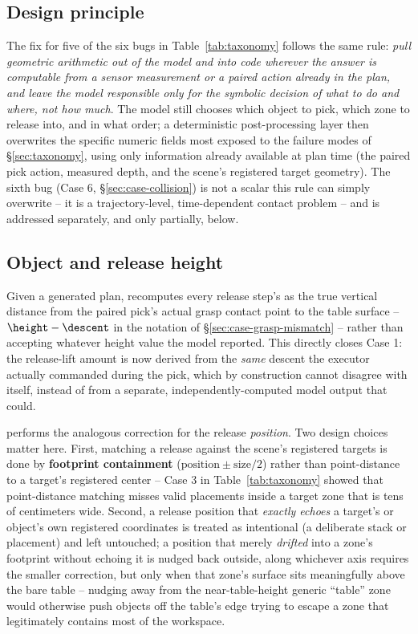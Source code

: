 \subsection{Design principle}

The fix for five of the six bugs in Table~\ref{tab:taxonomy} follows the
same rule: \emph{pull geometric arithmetic out of the model and into code
wherever the answer is computable from a sensor measurement or a paired
action already in the plan, and leave the model responsible only for the
symbolic decision of what to do and where, not how much}. The model still
chooses which object to pick, which zone to release into, and in what
order; a deterministic post-processing layer then overwrites the specific
numeric fields most exposed to the failure modes of
\S\ref{sec:taxonomy}, using only information already available at plan
time (the paired pick action, measured depth, and the scene's registered
target geometry). The sixth bug (Case 6, \S\ref{sec:case-collision}) is
not a scalar this rule can simply overwrite -- it is a trajectory-level,
time-dependent contact problem -- and is addressed separately, and only
partially, below.

\subsection{Object and release height}
\label{sec:fix-height}

Given a generated plan,  recomputes every
release step's  as the true vertical distance from
the paired pick's actual grasp contact point to the table surface --
$\height - \descent$ in the notation of \S\ref{sec:case-grasp-mismatch}
-- rather than accepting whatever height value the model reported. This
directly closes Case 1: the release-lift amount is now derived from the
\emph{same} descent the executor actually commanded during the pick,
which by construction cannot disagree with itself, instead of from a
separate, independently-computed model output that could.

 performs the analogous correction for the
release \emph{position}. Two design choices matter here. First, matching
a release against the scene's registered targets is done by
\textbf{footprint containment} ($\text{position} \pm \text{size}/2$)
rather than point-distance to a target's registered center -- Case 3 in
Table~\ref{tab:taxonomy} showed that point-distance matching misses valid
placements inside a target zone that is tens of centimeters wide.
Second, a release position that \emph{exactly echoes} a target's or
object's own registered coordinates is treated as intentional (a
deliberate stack or placement) and left untouched; a position that merely
\emph{drifted} into a zone's footprint without echoing it is nudged back
outside, along whichever axis requires the smaller correction, but only
when that zone's surface sits meaningfully above the bare table -- nudging
away from the near-table-height generic ``table'' zone would otherwise
push objects off the table's edge trying to escape a zone that legitimately
contains most of the workspace.

